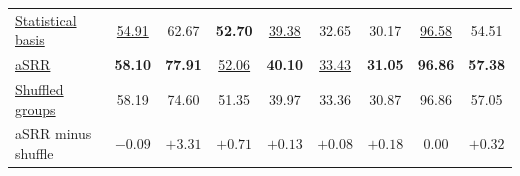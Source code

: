 \begin{table}[htbp]
\begin{tabular*}{\linewidth}{@{\extracolsep{\fill}}lcccccccc@{}}
\hyperref[app:spectral-controls]{Statistical basis} & \underline{54.91} & 62.67 & \textbf{52.70} & \underline{39.38} & 32.65 & 30.17 & \underline{96.58} & 54.51 \\
\hyperref[alg:asrr]{aSRR} & \textbf{58.10} & \textbf{77.91} & \underline{52.06} & \textbf{40.10} & \underline{33.43} & \textbf{31.05} & \textbf{96.86} & \textbf{57.38} \\
\midrule
\hyperref[app:shuffle-control]{Shuffled groups} & 58.19 & 74.60 & 51.35 & 39.97 & 33.36 & 30.87 & 96.86 & 57.05 \\
aSRR minus shuffle & $-0.09$ & $+3.31$ & $+0.71$ & $+0.13$ & $+0.08$ & $+0.18$ & $0.00$ & $+0.32$ \\
\bottomrule
\end{tabular*}
\end{table}
